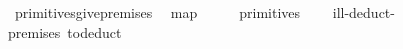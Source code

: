 \ primitives{\isacharunderscore}give{\isacharunderscore}premises{\isacharcolon}\isanewline
\ \ \isaindent{{\isacharequal}\ }map\ {\isacharparenleft}{\isasymlambda}{\isacharparenleft}\ \ \ \ \ {\isacharparenleft}primitives\ \isanewline
\ \ {\isacharequal}\ ill-deduct-premises\ {\isacharparenleft}to{\isacharunderscore}deduct\ 
